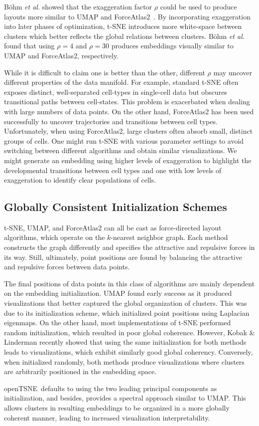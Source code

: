 \documentclass[letter]{article}
\newcommand{\opentsne}{\textsf{openTSNE}}
\begin{document}
B{\"o}hm \textit{et al.} showed that the exaggeration factor $\rho$
could be used to produce layouts more similar to UMAP and
ForceAtlas2~\cite{bohm2020unifying}. By incorporating exaggeration
into later phases of optimization, t-SNE introduces more white-space
between clusters which better reflects the global relations between
clusters. B{\"o}hm \textit{et al.} found that using $\rho=4$ and
$\rho=30$ produces embeddings visually similar to UMAP and
ForceAtlas2, respectively.

While it is difficult to claim one is better than the other, different
$\rho$ may uncover different properties of the data manifold. For
example, standard t-SNE often exposes distinct, well-separated
cell-types in single-cell data but obscures transitional paths between
cell-states. This problem is exacerbated when dealing with large
numbers of data points. On the other hand, ForceAtlas2 has been used
successfully to uncover trajectories and transitions between cell
types. Unfortunately, when using ForceAtlas2, large clusters often
absorb small, distinct groups of cells. One might run t-SNE with
various parameter settings to avoid switching between different
algorithms and obtain similar visualizations. We might generate an
embedding using higher levels of exaggeration to highlight the
developmental transitions between cell types and one with low levels
of exaggeration to identify clear populations of cells.

\subsection*{Globally Consistent Initialization Schemes}

t-SNE, UMAP, and ForceAtlas2 can all be cast as force-directed layout
algorithms, which operate on the $k$-nearest neighbor graph. Each
method constructs the graph differently and specifies the attractive
and repulsive forces in its way. Still, ultimately, point positions
are found by balancing the attractive and repulsive forces between
data points.

The final positions of data points in this class of algorithms are
mainly dependent on the embedding initialization. UMAP found early
success as it produced visualizations that better captured the global
organization of clusters. This was due to its initialization scheme,
which initialized point positions using Laplacian eigenmaps. On the
other hand, most implementations of t-SNE performed random
initialization, which resulted in poor global coherence. However,
Kobak \& Linderman recently showed that using the same initialization
for both methods leads to visualizations, which exhibit similarly good
global coherency. Conversely, when initialized randomly, both methods
produce visualizations where clusters are arbitrarily positioned in
the embedding space.

\opentsne\ defaults to using the two leading principal components as
initialization, and besides, provides a spectral approach similar to
UMAP. This allows clusters in resulting embeddings to be organized in
a more globally coherent manner, leading to increased visualization
interpretability.
\end{document}
